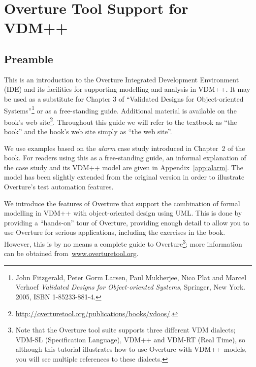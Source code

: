 \chapter{Overture Tool Support for VDM++}\label{cha:toolbox}
\initexercise

\section*{Preamble}

This is an introduction to the Overture Integrated Development Environment (IDE) and its facilities for supporting modelling and analysis in VDM++. It may be used as a substitute for Chapter 3 of ``Validated Designs for Object-oriented Systems''\footnote{John Fitzgerald, Peter Gorm Larsen, Paul Mukherjee, Nico Plat and Marcel Verhoef \emph{Validated Designs for Object-oriented Systems}, Springer, New York. 2005, ISBN 1-85233-881-4.} or as a free-standing guide. Additional material is available on the book's web site\footnote{\url{http://overturetool.org/publications/books/vdoos/}.}. Throughout this guide we will refer to the textbook as ``the book'' and the book's web site simply as ``the web site''.

We use examples based on the \emph{alarm} case study introduced in Chapter~2 of the book. For readers using this as a free-standing guide, an informal explanation of the case study and its VDM++ model are given in Appendix~\ref{app:alarm}. The model has been slightly extended from the original version in order to illustrate Overture's test automation features.

We introduce the features of Overture that support the combination of formal modelling in VDM++ with object-oriented design using UML. This is done by providing a ``hands-on'' tour of Overture, providing enough detail to allow you to use Overture for serious applications, including the exercises in the book. However, this is by no means a complete guide to Overture\footnote{Note that the Overture tool suite supports three different VDM dialects; VDM-SL (Specification Language), VDM++ and VDM-RT (Real Time), so although this tutorial illustrates how to use Overture with VDM++ models, you will see multiple references to these dialects.}; more information can be obtained from~\url{www.overturetool.org}.
%
